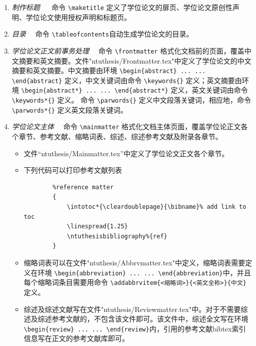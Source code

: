 \begin{enumerate}
\item \emph{制作标题} ~~ 命令 \verb|\maketitle| 定义了学位论文的扉页、学位论文原创性声明、学位论文使用授权声明和标题页。
\item \emph{目录}~~ 命令 \verb|\tableofcontents|自动生成学位论文的目录。
\item \emph{学位论文正文前事务处理}~~ 命令 \verb|\frontmatter| 格式化文档前的页面，覆盖中文摘要和英文摘要。文件"ntuthesis/Frontmatter.tex"中定义了学位论文的中文摘要和英文摘要。中文摘要由环境 \verb|\begin{abstract} ... ... \end{abstract}| 定义，中文关键词由命令 \verb|\keywords{}| 定义；英文摘要由环境 \verb|\begin{abstract*} ... ... \end{abstract*}| 定义，英文关键词由命令 \verb|\keywords*{}| 定义。 命令 \verb|\parwords{}| 定义中文段落关键词，相应地，命令 \verb|\parwords*{}| 定义英文段落关键词。
\item \emph{学位论文主体}~~ 命令 \verb|\mainmatter| 格式化文档主体页面，覆盖学位论正文各个章节、参考文献、缩略词表、综述、综述参考文献及附录各章节。
    \begin{itemize}
    \item 文件“ntuthesis/Mainmatter.tex”中定义了学位论文正文各个章节。
    \item 下列代码可以打印参考文献列表
        \begin{verbatim}
        %reference matter
        {
            \intotoc*{\cleardoublepage}{\bibname}% add link to toc
            \linespread{1.25}
            \ntuthesisbibliography%{ref}
        }
        \end{verbatim}
    \item 缩略词表可以在文件"ntuthesis/Abbrvmatter.tex"中定义，缩略词表需要定义在环境 \verb|\begin{abbreviation} ... ... \end{abbreviation}|中，并且每个缩略词条目需要用命令 \verb|\addabbrvitem{<缩略词>}{<英文全称>}{中文}| 定义。
    \item 综述及综述文献写在文件"ntuthesis/Reviewmatter.tex"中。对于不需要综述及综述参考文献的，不包含该文件即可。该文件中，综述全文写在环境\verb|\begin{review} ... ... \end{review}|内，引用的参考文献bibtex索引信息写在正文的参考文献库即可。

\end{itemize}
\end{enumerate}
